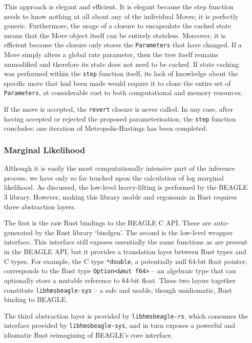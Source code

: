 \documentclass[10pt,journal,compsoc]{IEEEtran}
\begin{document}
This approach is elegant and efficient. It is elegant because the step function needs to know nothing at all about any of the individual Moves; it is perfectly generic. Furthermore, the usage of a closure to encapsulate the cached state means that the Move object itself can be entirely stateless. Moreover, it is efficient because the closure only stores the \texttt{Parameters} that have changed. If a Move simply alters a global rate parameter, then the tree itself remains unmodified and therefore its state does not need to be cached. If state caching was performed within the \texttt{step} function itself, its lack of knowledge about the specific move that had been made would require it to clone the entire set of \texttt{Parameters}, at considerable cost to both computational and memory resources. 

If the move is accepted, the \texttt{revert} closure is never called. In any case, after having accepted or rejected the proposed parameterisation, the \texttt{step} function concludes: one iteration of Metropolis-Hastings has been completed.


\subsubsection{Marginal Likelihood}
  
Although it is easily the most computationally intensive part of the inference process, we have only so far touched upon the calculation of log marginal likelihood. As discussed, the low-level heavy-lifting is performed by the BEAGLE 3 library. However, making this library usable and ergonomic in Rust requires three abstraction layers. 

The first is the raw Rust bindings to the BEAGLE C API. These are auto-generated by the Rust library `bindgen'. The second is the low-level wrapper interface. This interface still exposes essentially the same functions as are present in the BEAGLE API, but it provides a translation layer between Rust types and C types. For example, the C type \texttt{*double}, a potentially null 64-bit float pointer, corresponds to the Rust type \texttt{Option<\&mut f64>} -- an algebraic type that can optionally store a mutable reference to 64-bit float. These two layers together constitute \texttt{libhmsbeagle-sys} -- a safe and usable, though unidiomatic, Rust binding to BEAGLE.

The third abstraction layer is provided by \texttt{libhmsbeagle-rs}, which consumes the interface provided by \texttt{libhmsbeagle-sys}, and in turn exposes a powerful and idiomatic Rust reimagining of BEAGLE's core interface.
\end{document}
